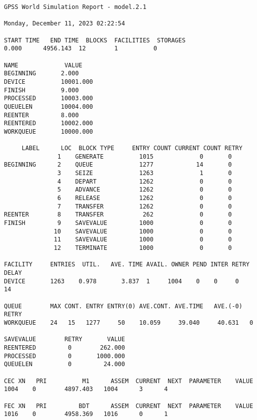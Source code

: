\begin{lstlisting}[label=lst:1,caption=Результат работы разработанной программы на проценте возврата 20\%]
GPSS World Simulation Report - model.2.1

Monday, December 11, 2023 02:22:54

START TIME   END TIME  BLOCKS  FACILITIES  STORAGES
0.000      4956.143  12        1          0

NAME             VALUE
BEGINNING       2.000
DEVICE          10001.000
FINISH          9.000
PROCESSED       10003.000
QUEUELEN        10004.000
REENTER         8.000
REENTERED       10002.000
WORKQUEUE       10000.000

     LABEL      LOC  BLOCK TYPE     ENTRY COUNT CURRENT COUNT RETRY
               1    GENERATE          1015             0       0
BEGINNING      2    QUEUE             1277            14       0
               3    SEIZE             1263             1       0
               4    DEPART            1262             0       0
               5    ADVANCE           1262             0       0
               6    RELEASE           1262             0       0
               7    TRANSFER          1262             0       0
REENTER        8    TRANSFER           262             0       0
FINISH         9    SAVEVALUE         1000             0       0
              10    SAVEVALUE         1000             0       0
              11    SAVEVALUE         1000             0       0
              12    TERMINATE         1000             0       0

FACILITY     ENTRIES  UTIL.   AVE. TIME AVAIL. OWNER PEND INTER RETRY DELAY
DEVICE       1263    0.978       3.837  1     1004    0    0     0     14

QUEUE        MAX CONT. ENTRY ENTRY(0) AVE.CONT. AVE.TIME   AVE.(-0) RETRY
WORKQUEUE    24   15   1277     50    10.059     39.040     40.631   0

SAVEVALUE        RETRY       VALUE
REENTERED         0        262.000                            
PROCESSED         0       1000.000                            
QUEUELEN          0         24.000                            

CEC XN   PRI          M1      ASSEM  CURRENT  NEXT  PARAMETER    VALUE
1004    0        4897.403   1004      3      4

FEC XN   PRI         BDT      ASSEM  CURRENT  NEXT  PARAMETER    VALUE
1016    0        4958.369   1016      0      1	
\end{lstlisting}

